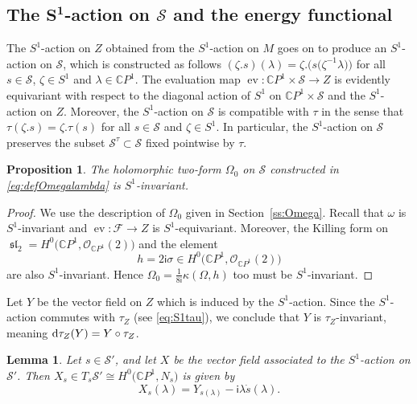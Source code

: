 \documentclass[pdftex]{sigma}
\numberwithin{equation}{section}
\newtheorem{Lemma}[Theorem]{Lemma}
\newtheorem{Proposition}[Theorem]{Proposition}
\theoremstyle{definition}
\newcommand{\lie}[1]{\operatorname{\mathfrak{#1}}}
\newcommand{\sln}{\lie{sl}}
\newcommand\C{{\mathbb C}}
\renewcommand{\i}{\mathsf{i}}
\begin{document}
\subsection[The S\^{}1-action on S and the energy functional]{The $\boldsymbol{S^1}$-action on $\boldsymbol{\mathcal S}$ and the energy functional}

The $S^1$-action on $Z$ obtained from the $S^1$-action on $M$ goes on to
produce an $S^1$-action on $\mathcal S$, which is constructed as follows
$%
(\zeta.s)(\lambda) = \zeta.\bigl(s\bigl(\zeta^{-1}\lambda\bigr)\bigr)
$
for all $s \in \mathcal S$, $\zeta \in S^1$ and $\lambda \in \C P^1$.
The evaluation map $\operatorname{ev}\colon \C P^1 \times \mathcal S \longrightarrow Z$ is evidently
equivariant with respect to the diagonal action of $S^1$ on $\C P^1 \times \mathcal S$ and the $S^1$-action on $Z$.
Moreover, the $S^1$-action on $\mathcal S$ is compatible with $\tau$ in the sense
that
$
\tau(\zeta.s) = \zeta.\tau(s)
$
for all $s \in \mathcal S$ and $\zeta \in S^1$.
In particular, the $S^1$-action on $\mathcal S$ preserves the subset ${\mathcal S}^\tau \subset
{\mathcal S}$ fixed pointwise by $\tau$.

\begin{Proposition}
The holomorphic two-form $\Omega_0$ on ${\mathcal S}$ constructed in \eqref{eq:defOmegalambda} is $S^1$-invariant.
\end{Proposition}

\begin{proof}
We use the description of $\Omega_0$ given in Section~\ref{ss:Omega}. Recall that $\omega$ is $S^1$-invariant and
$\operatorname{ev}\colon \mathcal F \longrightarrow Z$ is $S^1$-equivariant. Moreover, the Killing form on
$\sln_2 = H^0\bigl(\C P^1, \mathcal{O}_{\C P^1}(2)\bigr)$ and the element \[h = 2\i\sigma \in H^0\bigl(\C P^1, \mathcal{O}_{\C P^1}(2)\bigr)\]
are also $S^1$-invariant. Hence $\Omega_0 = \frac{1}{8 \i}\kappa( \Omega,h)$ too must be
$S^1$-invariant.
\end{proof}

Let $Y$ be the vector field on $Z$ which is induced by the
$S^1$-action. Since the $S^1$-action commutes with $\tau_Z$ (see \eqref{eq:S1tau}), we conclude that
$Y$ is $\tau_Z$-invariant, meaning ${\rm d}\tau_Z(Y) = Y\circ \tau_Z$.

\begin{Lemma}\label{RelationXandY}
Let $s \in \mathcal S'$, and let $X$ be the vector field associated to the $S^1$-action on ${\mathcal S}'$.
Then $X_s \in T_s\mathcal S' \cong H^0\bigl(\C P^1, N_s\bigr)$ is given by
\begin{equation}\label{Eq: XsYsdots}
X_s(\lambda) = Y_{s(\lambda)} - \i \lambda \dot{s}(\lambda).
\end{equation}
\end{Lemma}
\end{document}

